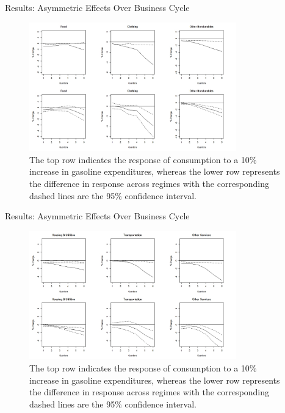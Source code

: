 \documentclass[
  10pt,
  ignorenonframetext,
]{beamer}
\begin{document}
\begin{frame}{Results: Asymmetric Effects Over Business Cycle}
\protect\hypertarget{results-asymmetric-effects-over-business-cycle-4}{}

\begin{figure}
\centering
\includegraphics[width=0.8\textwidth,height=\textheight]{Asymmetry - 2.jpeg}
\caption{The top row indicates the response of consumption to a 10\%
increase in gasoline expenditures, whereas the lower row represents the
difference in response across regimes with the corresponding dashed
lines are the 95\% confidence interval.}
\end{figure}

\end{frame}

\begin{frame}{Results: Asymmetric Effects Over Business Cycle}
\protect\hypertarget{results-asymmetric-effects-over-business-cycle-5}{}

\begin{figure}
\centering
\includegraphics[width=0.8\textwidth,height=\textheight]{Asymmetry - 3.jpeg}
\caption{The top row indicates the response of consumption to a 10\%
increase in gasoline expenditures, whereas the lower row represents the
difference in response across regimes with the corresponding dashed
lines are the 95\% confidence interval.}
\end{figure}

\end{frame}
\end{document}
